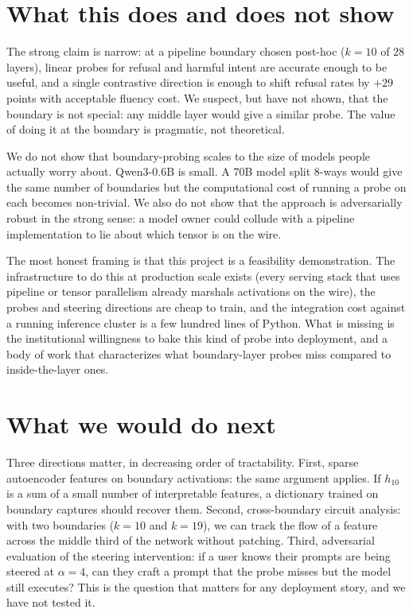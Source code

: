 \documentclass[11pt]{article}
\begin{document}
\section{What this does and does not show}

The strong claim is narrow: at a pipeline boundary chosen post-hoc ($k=10$ of $28$ layers), linear probes for refusal and harmful intent are accurate enough to be useful, and a single contrastive direction is enough to shift refusal rates by $+29$ points with acceptable fluency cost. We suspect, but have not shown, that the boundary is not special: any middle layer would give a similar probe. The value of doing it at the boundary is pragmatic, not theoretical.

We do not show that boundary-probing scales to the size of models people actually worry about. Qwen3-0.6B is small. A $70$B model split 8-ways would give the same number of boundaries but the computational cost of running a probe on each becomes non-trivial. We also do not show that the approach is adversarially robust in the strong sense: a model owner could collude with a pipeline implementation to lie about which tensor is on the wire.

The most honest framing is that this project is a feasibility demonstration. The infrastructure to do this at production scale exists (every serving stack that uses pipeline or tensor parallelism already marshals activations on the wire), the probes and steering directions are cheap to train, and the integration cost against a running inference cluster is a few hundred lines of Python. What is missing is the institutional willingness to bake this kind of probe into deployment, and a body of work that characterizes what boundary-layer probes miss compared to inside-the-layer ones.

\section{What we would do next}

Three directions matter, in decreasing order of tractability. First, sparse autoencoder features \citep{bricken2023monosemanticity, cunningham2023sparse} on boundary activations: the same argument applies. If $h_{10}$ is a sum of a small number of interpretable features, a dictionary trained on boundary captures should recover them. Second, cross-boundary circuit analysis: with two boundaries ($k=10$ and $k=19$), we can track the flow of a feature across the middle third of the network without patching. Third, adversarial evaluation of the steering intervention: if a user knows their prompts are being steered at $\alpha=4$, can they craft a prompt that the probe misses but the model still executes? This is the question that matters for any deployment story, and we have not tested it.
\end{document}
